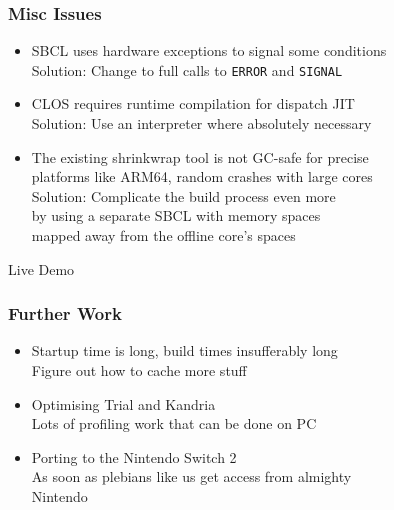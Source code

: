 \documentclass[14pt,t,aspectratio=169]{beamer}
\begin{document}
\begin{frame}
  \frametitle{Misc Issues}
  \begin{itemize}
  \item SBCL uses hardware exceptions to signal some conditions \\
    \Rightarrow{} Solution: Change to full calls to \texttt{ERROR} and \texttt{SIGNAL}
  \item CLOS requires runtime compilation for dispatch JIT \\
    \Rightarrow{} Solution: Use an interpreter where absolutely necessary
  \item The existing shrinkwrap tool is not GC-safe for precise \\
    platforms like ARM64, random crashes with large cores \\
    \Rightarrow{} Solution: Complicate the build process even more \\
    \quad by using a separate SBCL with memory spaces \\
    \quad mapped away from the offline core's spaces
  \end{itemize}
\end{frame}

\begin{frame}[c]{ }
  \centering
  {\Huge Live Demo}
\end{frame}

\begin{frame}
  \frametitle{Further Work}
  \begin{itemize}
  \item Startup time is long, build times insufferably long \\
    \Rightarrow{} Figure out how to cache more stuff
  \item Optimising Trial and Kandria \\
    \Rightarrow{} Lots of profiling work that can be done on PC
  \item Porting to the Nintendo Switch 2 \\
    \Rightarrow{} As soon as plebians like us get access from almighty \\\quad Nintendo
  \end{itemize}
\end{frame}
\end{document}
